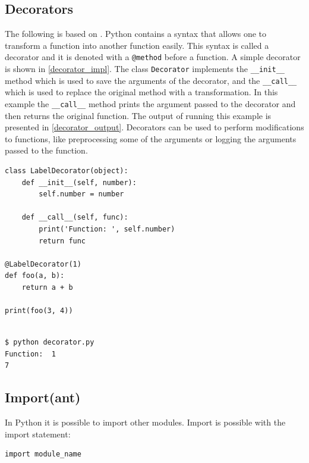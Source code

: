\subsection{Decorators}
The following is based on \citet[p.~558]{lutz2013learning}.
Python contains a syntax that allows one to transform a function into another function easily.
This syntax is called a decorator and it is denoted with a \texttt{@method} before a function.
A simple decorator is shown in \cref{decorator_impl}.
The class \texttt{Decorator} implements the \texttt{\_\_init\_\_} method which is used to save the arguments of the decorator, and the \texttt{\_\_call\_\_} which is used to replace the original method with a transformation.
In this example the \texttt{\_\_call\_\_} method prints the argument passed to the decorator and then returns the original function.
The output of running this example is presented in \cref{decorator_output}.
Decorators can be used to perform modifications to functions, like preprocessing some of the arguments or logging the arguments passed to the function.


\begin{lstlisting}[style=python, caption={Implementation of a simple decorator}, label={decorator_impl}]
class LabelDecorator(object):
    def __init__(self, number):
        self.number = number

    def __call__(self, func):
        print('Function: ', self.number)
        return func
        
@LabelDecorator(1)
def foo(a, b):
    return a + b

print(foo(3, 4))
 
\end{lstlisting}

\begin{lstlisting}[style=python, caption={Output when running the previous example}, label={decorator_output}]
$ python decorator.py
Function:  1
7
\end{lstlisting}

\subsection{Import(ant)}
In Python it is possible to import other modules.
Import is possible with the import statement:

\begin{lstlisting}[style=python, caption={Import statement.}, label={import:standard}]
  import module_name
\end{lstlisting}

